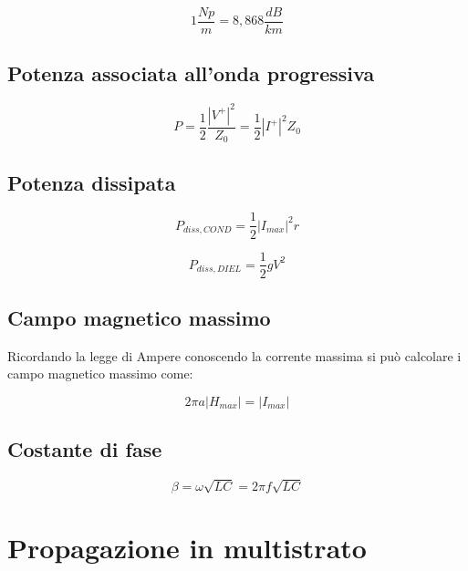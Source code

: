 \documentclass[10pt,a4paper]{report}
\begin{document}
	\begin{equation}
	1\frac{Np}{m}=8,868\frac{dB}{km}
	\end{equation}
	
	\section{Potenza associata all'onda progressiva}

			\begin{equation}
			P=\frac{1}{2}\frac{|V^+|^2}{Z_0}=\frac{1}{2}|I^+|^2 Z_0
			\end{equation}

	\section{Potenza dissipata}

			\begin{equation}
			P_{diss,COND}=\frac{1}{2}|I_{max}|^2 r
			\end{equation}

			\begin{equation}
			P_{diss,DIEL}=\frac{1}{2} g V^2
			\end{equation}

	\section{Campo magnetico massimo}
	
 			Ricordando la legge di Ampere conoscendo la corrente massima si può calcolare i campo magnetico massimo come:

			\begin{equation}
			2 \pi a |H_{max}| = |I_{max}|
			\end{equation}

	\section{Costante di fase}
			\begin{equation}
				\beta=\omega \sqrt{LC}=2 \pi f \sqrt{LC}
			\end{equation}
		
\chapter{Propagazione in multistrato}
\end{document}
